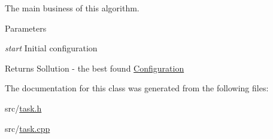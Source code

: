 The main business of this algorithm. 


\begin{DoxyParams}{Parameters}
\item[{\em start}]Initial configuration \end{DoxyParams}
\begin{DoxyReturn}{Returns}
Sollution -\/ the best found \hyperlink{class_configuration}{Configuration} 
\end{DoxyReturn}


The documentation for this class was generated from the following files:\begin{DoxyCompactItemize}
\item 
src/\hyperlink{task_8h}{task.h}\item 
src/\hyperlink{task_8cpp}{task.cpp}\end{DoxyCompactItemize}
